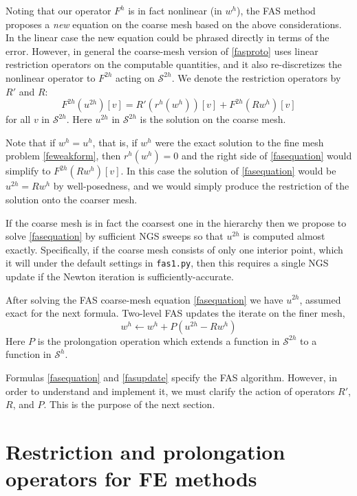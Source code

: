 \documentclass[letterpaper,final,12pt,reqno]{amsart}
\begin{document}
Noting that our operator $F^h$ is in fact nonlinear (in $w^h$), the FAS method  proposes a \emph{new} equation on the coarse mesh based on the above considerations.  In the linear case the new equation could be phrased directly in terms of the error.  However, in general the coarse-mesh version of \eqref{fasproto} uses linear restriction operators on the computable quantities, and it also re-discretizes the nonlinear operator to $F^{2h}$ acting on $\mathcal{S}^{2h}$.  We denote the restriction operators by $R'$ and $R$:
\begin{equation}
  F^{2h}(u^{2h})[v] = R' (r^h(w^h))[v] + F^{2h}(R w^h)[v] \label{fasequation}
\end{equation}
for all $v$ in $\mathcal{S}^{2h}$.  Here $u^{2h}$ in $\mathcal{S}^{2h}$ is the solution on the coarse mesh.

Note that if $w^h=u^h$, that is, if $w^h$ were the exact solution to the fine mesh problem \eqref{feweakform}, then $r^h(w^h)=0$ and the right side of \eqref{fasequation} would simplify to $F^{2h}(R w^h)[v]$.  In this case the solution of \eqref{fasequation} would be $u^{2h} = R w^h$ by well-posedness, and we would simply produce the restriction of the solution onto the coarser mesh.

If the coarse mesh is in fact the coarsest one in the hierarchy then we propose to solve \eqref{fasequation} by sufficient NGS sweeps so that $u^{2h}$ is computed almost exactly.  Specifically, if the coarse mesh consists of only one interior point, which it will under the default settings in \texttt{fas1.py}, then this requires a single NGS update if the Newton iteration is sufficiently-accurate.

After solving the FAS coarse-mesh equation \eqref{fasequation} we have $u^{2h}$, assumed exact for the next formula.  Two-level FAS updates the iterate on the finer mesh,
\begin{equation}
  w^h \longleftarrow w^h + P(u^{2h} - R w^h) \label{fasupdate}
\end{equation}
Here $P$ is the prolongation operation which extends a function in $\mathcal{S}^{2h}$ to a function in $\mathcal{S}^h$.

Formulas \eqref{fasequation} and \eqref{fasupdate} specify the FAS algorithm.  However, in order to understand and implement it, we must clarify the action of operators $R'$, $R$, and $P$.  This is the purpose of the next section.


\section{Restriction and prolongation operators for FE methods}
\end{document}
